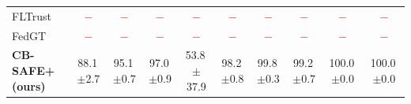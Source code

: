 \begin{table}[t]
\begin{tabular}{@{}lccccccccc@{}}
FLTrust~\cite{fltrust} & \textcolor{red}{$-$} & \textcolor{red}{$-$} & \textcolor{red}{$-$} & \textcolor{red}{$-$} & \textcolor{red}{$-$} & \textcolor{red}{$-$} & \textcolor{red}{$-$} & \textcolor{red}{$-$} & \textcolor{red}{$-$}\\
FedGT~\cite{fedgt} & \textcolor{red}{$-$} & \textcolor{red}{$-$} & \textcolor{red}{$-$} & \textcolor{red}{$-$} & \textcolor{red}{$-$} & \textcolor{red}{$-$} & \textcolor{red}{$-$} & \textcolor{red}{$-$} & \textcolor{red}{$-$}\\
\textbf{CB-SAFE+ (ours)} & 88.1\,{\scriptsize$\pm$2.7} & 95.1\,{\scriptsize$\pm$0.7} & 97.0\,{\scriptsize$\pm$0.9} & 53.8\,{\scriptsize$\pm$37.9} & 98.2\,{\scriptsize$\pm$0.8} & 99.8\,{\scriptsize$\pm$0.3} & 99.2\,{\scriptsize$\pm$0.7} & 100.0\,{\scriptsize$\pm$0.0} & 100.0\,{\scriptsize$\pm$0.0}\\
\bottomrule\end{tabular}\end{table}